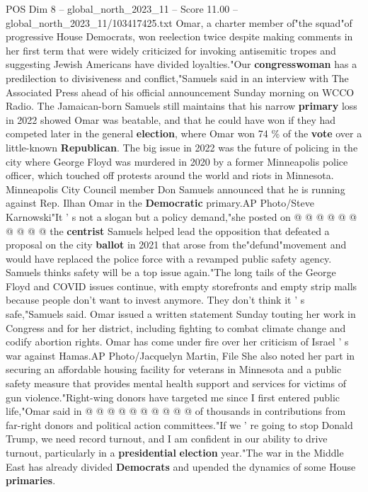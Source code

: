 \begin{textsample}{POS Dim 8 – global\_north\_2023\_11 – Score 11.00 – global\_north\_2023\_11/103417425.txt}  \label{ex:f8_pos_124}
Omar, a charter member of"the squad"of progressive House Democrats, won reelection twice despite making comments in her first term that were widely criticized for invoking antisemitic tropes and suggesting Jewish Americans have divided loyalties."Our \textbf{congresswoman} has a predilection to divisiveness and conflict,"Samuels said in an interview with The Associated Press ahead of his official announcement Sunday morning on WCCO Radio.
The Jamaican-born Samuels still maintains that his narrow \textbf{primary} loss in 2022 showed Omar was beatable, and that he could have won if they had competed later in the general \textbf{election}, where Omar won 74 \% of the \textbf{vote} over a little-known \textbf{Republican}.
The big issue in 2022 was the future of policing in the city where George Floyd was murdered in 2020 by a former Minneapolis police officer, which touched off protests around the world and riots in Minnesota.
Minneapolis City Council member Don Samuels announced that he is running against Rep.
Ilhan Omar in the \textbf{Democratic} primary.AP Photo/Steve Karnowski"It ' s not a slogan but a policy demand,"she posted on @ @ @ @ @ @ @ @ @ @ the \textbf{centrist} Samuels helped lead the opposition that defeated a proposal on the city \textbf{ballot} in 2021 that arose from the"defund"movement and would have replaced the police force with a revamped public safety agency.
Samuels thinks safety will be a top issue again."The long tails of the George Floyd and COVID issues continue, with empty storefronts and empty strip malls because people don't want to invest anymore.
They don't think it ' s safe,"Samuels said.
Omar issued a written statement Sunday touting her work in Congress and for her district, including fighting to combat climate change and codify abortion rights.
Omar has come under fire over her criticism of Israel ' s war against Hamas.AP Photo/Jacquelyn Martin, File She also noted her part in securing an affordable housing facility for veterans in Minnesota and a public safety measure that provides mental health support and services for victims of gun violence."Right-wing donors have targeted me since I first entered public life,"Omar said in @ @ @ @ @ @ @ @ @ @ of thousands in contributions from far-right donors and political action committees."If we ' re going to stop Donald Trump, we need record turnout, and I am confident in our ability to drive turnout, particularly in a \textbf{presidential} \textbf{election} year."The war in the Middle East has already divided \textbf{Democrats} and upended the dynamics of some House \textbf{primaries}.

\end{textsample}
